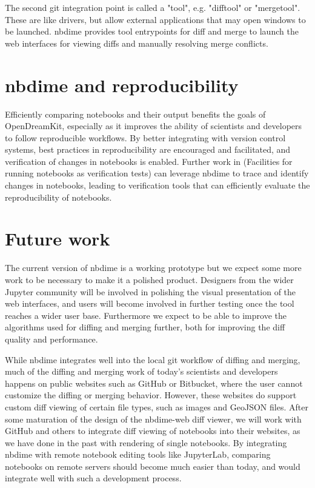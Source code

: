 \documentclass{deliverablereport}
\begin{document}
The second git integration point is called a "tool", e.g. "difftool" or "mergetool".
These are like drivers, but allow external applications that may open windows to be launched.
nbdime provides tool entrypoints for diff and merge to launch the web interfaces for viewing diffs
and manually resolving merge conflicts.


\section{nbdime and reproducibility} %
\label{sec:nbdime_and_reproducibility}

Efficiently comparing notebooks and their output benefits the goals of OpenDreamKit,
especially as it improves the ability of scientists and developers to follow reproducible workflows.
By better integrating with version control systems,
best practices in reproducibility are encouraged and facilitated,
and verification of changes in notebooks is enabled.
Further work in  (Facilities for running notebooks as verification tests)
can leverage nbdime to trace and identify changes in notebooks,
leading to verification tools that can efficiently evaluate the reproducibility of notebooks.

\section{Future work}

The current version of nbdime is a working prototype but we expect
some more work to be necessary to make it a polished product.
Designers from the wider Jupyter community will be involved in
polishing the visual presentation of the web interfaces,
and users will become involved in further testing once the tool
reaches a wider user base. Furthermore we expect to be able to
improve the algorithms used for diffing and merging further,
both for improving the diff quality and performance.

While nbdime integrates well into the local git workflow of diffing and merging,
much of the diffing and merging work of today's scientists and developers happens
on public websites such as GitHub or Bitbucket,
where the user cannot customize the diffing or merging behavior.
However, these websites do support custom diff viewing of certain file types,
such as images and GeoJSON files.
After some maturation of the design of the nbdime-web diff viewer,
we will work with GitHub and others to integrate diff viewing of notebooks into their websites,
as we have done in the past with rendering of single notebooks.
By integrating nbdime with remote notebook editing tools like JupyterLab, comparing notebooks on remote servers should become much easier than today, and would integrate well with such a development process.
\end{document}
